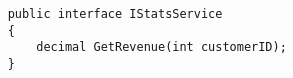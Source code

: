 \begin{verbatim}
    public interface IStatsService
    {
        decimal GetRevenue(int customerID);
    }
\end{verbatim}